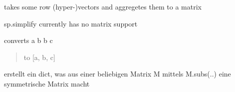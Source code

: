 \documentclass[letterpaper,10pt,english]{sphinxmanual}
\begin{document}

\begin{fulllineitems}
\label{pycontroltools:auxfuncs.math.matrix.row_stack}
takes some row (hyper-)vectors and aggregetes them to a matrix

\end{fulllineitems}


\begin{fulllineitems}
\label{pycontroltools:auxfuncs.math.matrix.simplify}
sp.simplify currently has no matrix support

\end{fulllineitems}


\begin{fulllineitems}
\label{pycontroltools:auxfuncs.math.matrix.symbMatrix}
\end{fulllineitems}


\begin{fulllineitems}
\label{pycontroltools:auxfuncs.math.matrix.symm_matrix_to_vect}
converts
a b
b c
\begin{quote}

to      {[}a, b, c{]}
\end{quote}

\end{fulllineitems}


\begin{fulllineitems}
\label{pycontroltools:auxfuncs.math.matrix.symmetryDict}
erstellt ein dict, was aus einer beliebigen Matrix M
mittels M.subs(..) eine symmetrische Matrix macht

\end{fulllineitems}
\end{document}
